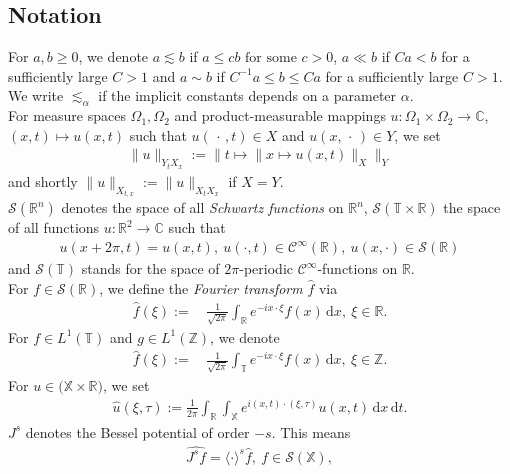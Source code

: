 \documentclass[reqno]{amsart}
\theoremstyle{Definitionl}
\theoremstyle{Definitionk}
\theoremstyle{definition}
\theoremstyle{Satzk}
\theoremstyle{Satzl}
\theoremstyle{Bemerkung}
\begin{document}
\subsection*{Notation}
For $a,b\ge0$, we denote $a\lesssim b$ if $a\le cb\text{ for some $c>0$}$, $a\ll b$ if $Ca<b$ for a sufficiently large $C>1$ and $a\sim b$ if $C^{-1}a\le b\le Ca$ for a sufficiently large $C>1$. We write $\lesssim_\alpha$ if the implicit constants depends on a parameter $\alpha$.\\[10pt]
For measure spaces $\Omega_1,\Omega_2$ and product-measurable mappings $u\colon \Omega_1\times \Omega_2\to\mathbb C$, $(x,t)\mapsto u(x,t)$ such that $u(\,\cdot\,,t)\in X$ and $u(x,\,\cdot\,)\in Y$, we set
\begin{align*}
\|u\|_{Y_tX_x}:=\big\|t\mapsto\|x\mapsto u(x,t)\|_{X}\big\|_{Y}
\end{align*}
and shortly $\|u\|_{X_{t,x}}:=\|u\|_{X_tX_x}$ if $X=Y$.\\[10pt]
$\mathcal S(\mathbb R^n)$ denotes the space of all \emph{Schwartz functions} on $\mathbb R^n$, $\mathcal S(\mathbb T\times\mathbb R)$ the space of all functions $u\colon\mathbb R^2\to\mathbb C$ such that
\begin{align*}
u(x+2\pi,t)=u(x,t),\ u(\cdot,t)\in\mathcal C^\infty(\mathbb R),\ u(x,\cdot)\in\mathcal S(\mathbb R)
\end{align*}
and $\mathcal S(\mathbb T)$ stands for the space of $2\pi$-periodic $\mathcal C^\infty$-functions on $\mathbb R$.\\[10pt]
For $f\in\mathcal S(\mathbb R)$, we define the \emph{Fourier transform} $\widehat f$ via
\begin{align*}
\widehat{f}(\xi):=&\, \frac{1}{\sqrt{2\pi}}\int_{\mathbb R}e^{-ix\cdot\xi}f(x)\,\mathrm dx,\ \xi\in\mathbb R.
\end{align*}
For $f\in L^1(\mathbb T)$ and $g\in L^1(\mathbb Z)$, we denote 
\begin{align*}
\widehat{f}(\xi):=&\, \frac{1}{\sqrt{2\pi}}\int_{\mathbb T}e^{-ix\cdot \xi}f(x)\,\mathrm dx,\ \xi\in\mathbb Z.
\end{align*}
For $u\in\mathcal (\mathbb X\times\mathbb R)$, we set
\begin{align*}
\widehat u(\xi,\tau):=\frac{1}{2\pi}\int_{\mathbb R}\int_{\mathbb X}e^{i(x,t)\cdot(\xi,\tau)}u(x,t)\,\mathrm dx\,\mathrm dt.
\end{align*}
$J^{s}$ denotes the Bessel potential of order $-s$. This means
\begin{align*}
\widehat{J^sf}= \langle \cdot\rangle^s\widehat f,\ f\in\mathcal S(\mathbb X),
\end{align*}
\end{document}
